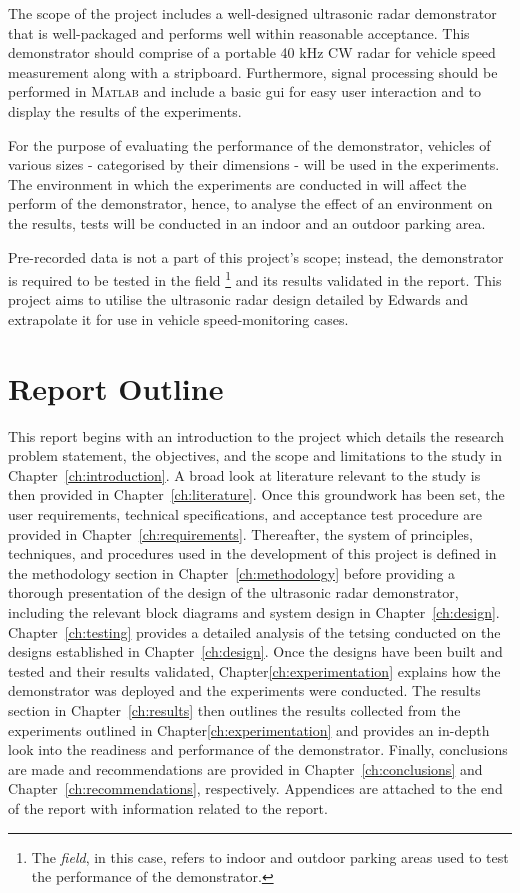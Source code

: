 \documentclass[class=report,11pt,crop=false]{standalone}
\begin{document}
The scope of the project includes a well-designed ultrasonic radar demonstrator that is well-packaged and performs well within reasonable acceptance. This demonstrator should comprise of a portable 40 kHz CW radar for vehicle speed measurement along with a stripboard. Furthermore, signal processing should be performed in \textsc{Matlab} and include a basic \gls{gui} for easy user interaction and to display the results of the experiments.

For the purpose of evaluating the performance of the demonstrator, vehicles of various sizes - categorised by their dimensions - will be used in the experiments. The environment in which the experiments are conducted in will affect the perform of the demonstrator, hence, to analyse the effect of an environment on the results, tests will be conducted in an indoor and an outdoor parking area.

Pre-recorded data is not a part of this project's scope; instead, the demonstrator is required to be tested in the field \footnote{The \emph{field}, in this case, refers to indoor and outdoor parking areas used to test the performance of the demonstrator.} and its results validated in the report. This project aims to utilise the ultrasonic radar design detailed by Edwards \cite{ian} and extrapolate it for use in vehicle speed-monitoring cases. 

\section{Report Outline}
This report begins with an introduction to the project which details the research problem statement, the objectives, and the scope and limitations to the study in Chapter~\ref{ch:introduction}. A broad look at literature relevant to the study is then provided in Chapter~\ref{ch:literature}. Once this groundwork has been set, the user requirements, technical specifications, and acceptance test procedure are provided in Chapter~\ref{ch:requirements}. Thereafter, the system of principles, techniques, and procedures used in the development of this project is defined in the methodology section in Chapter~\ref{ch:methodology} before providing a thorough presentation of the design of the ultrasonic radar demonstrator, including the relevant block diagrams and system design in Chapter~\ref{ch:design}. Chapter~\ref{ch:testing} provides a detailed analysis of the tetsing conducted on the designs established in Chapter~\ref{ch:design}. Once the designs have been built and tested and their results validated, Chapter\ref{ch:experimentation} explains how the demonstrator was deployed and the experiments were conducted. The results section in Chapter~\ref{ch:results} then outlines the results collected from the experiments outlined in Chapter\ref{ch:experimentation} and provides an in-depth look into the readiness and performance of the demonstrator. Finally, conclusions are made and recommendations are provided in Chapter~\ref{ch:conclusions} and Chapter~\ref{ch:recommendations}, respectively. Appendices are attached to the end of the report with information related to the report.

\ifstandalone

\printnoidxglossary[type=\acronymtype,nonumberlist]
\fi
\end{document}
